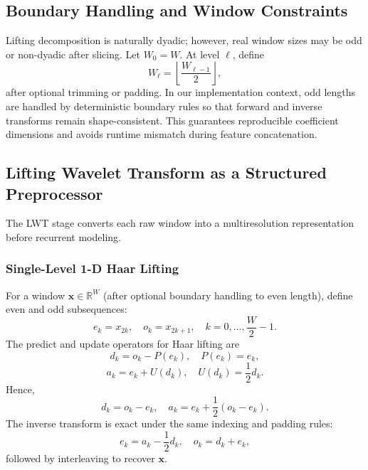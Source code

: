 \documentclass[journal]{IEEEtran}
\begin{document}
\subsection{Boundary Handling and Window Constraints}
Lifting decomposition is naturally dyadic; however, real window sizes may be odd or non-dyadic after slicing. Let $W_0=W$. At level $\ell$, define
\begin{equation}
W_{\ell}=\left\lfloor \frac{W_{\ell-1}}{2}\right\rfloor,
\end{equation}
after optional trimming or padding. In our implementation context, odd lengths are handled by deterministic boundary rules so that forward and inverse transforms remain shape-consistent. This guarantees reproducible coefficient dimensions and avoids runtime mismatch during feature concatenation.

\subsection{Lifting Wavelet Transform as a Structured Preprocessor}
The LWT stage converts each raw window into a multiresolution representation before recurrent modeling.

\subsubsection{Single-Level 1-D Haar Lifting}
For a window $\mathbf{x}\in\mathbb{R}^{W}$ (after optional boundary handling to even length), define even and odd subsequences:
\begin{equation}
e_k=x_{2k}, \quad o_k=x_{2k+1}, \quad k=0,\ldots,\frac{W}{2}-1.
\end{equation}
The predict and update operators for Haar lifting are
\begin{equation}
d_k=o_k-P(e_k), \quad P(e_k)=e_k,
\end{equation}
\begin{equation}
a_k=e_k+U(d_k), \quad U(d_k)=\frac{1}{2}d_k.
\end{equation}
Hence,
\begin{equation}
d_k=o_k-e_k, \quad a_k=e_k+\frac{1}{2}(o_k-e_k).
\end{equation}
The inverse transform is exact under the same indexing and padding rules:
\begin{equation}
e_k=a_k-\frac{1}{2}d_k, \quad o_k=d_k+e_k,
\end{equation}
followed by interleaving to recover $\mathbf{x}$.
\end{document}
